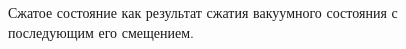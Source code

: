 \begin{figure}
\centering



\caption{Сжатое состояние как результат сжатия вакуумного состояния с
  последующим его смещением.}
\label{figPart3Squeezed_8}
\end{figure}
